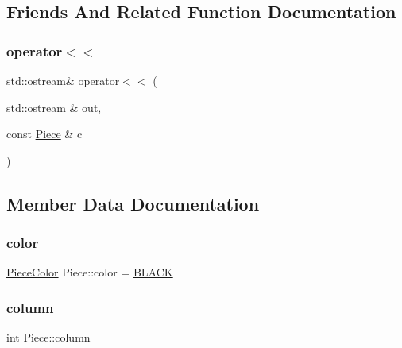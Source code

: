 \subsection{Friends And Related Function Documentation}
\mbox{\label{class_piece_a2030184caa17f039eb2a026a6dbc7d23}} 
\subsubsection{\texorpdfstring{operator$<$$<$}{operator<<}}
{\footnotesize\ttfamily std\+::ostream\& operator$<$$<$ (\begin{DoxyParamCaption}\item[{std\+::ostream \&}]{out,  }\item[{const \hyperlink{class_piece}{Piece} \&}]{c }\end{DoxyParamCaption})\hspace{0.3cm}{\ttfamily [friend]}}



\subsection{Member Data Documentation}
\mbox{\label{class_piece_a8dfe0501fe95a1a7618cf5ad3b9fda69}} 
\subsubsection{\texorpdfstring{color}{color}}
{\footnotesize\ttfamily \hyperlink{_piece_8h_ad7595c48bb74c0dd2a7648712a2d4985}{Piece\+Color} Piece\+::color = \hyperlink{_piece_8h_ad7595c48bb74c0dd2a7648712a2d4985af77fb67151d0c18d397069ad8c271ba3}{B\+L\+A\+CK}\hspace{0.3cm}{\ttfamily [private]}}

\mbox{\label{class_piece_aa8f39e11280395103164f6ae07398c82}} 
\subsubsection{\texorpdfstring{column}{column}}
{\footnotesize\ttfamily int Piece\+::column\hspace{0.3cm}{\ttfamily [private]}}

